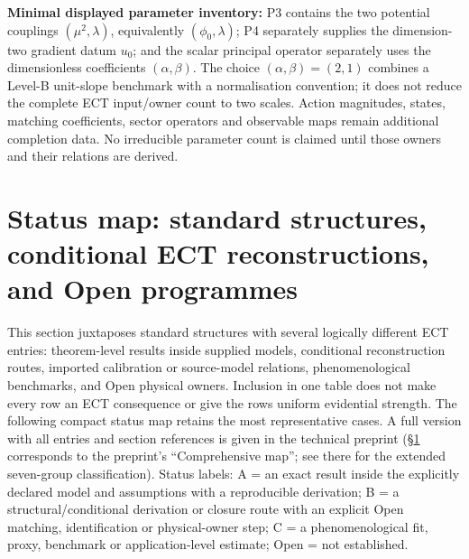 \documentclass[11pt,a4paper]{article}
\begin{document}
\textbf{Minimal displayed parameter inventory:} P3 contains the two potential
couplings $(\mu^2,\lambda)$, equivalently $(\phi_0,\lambda)$; P4 separately
supplies the dimension-two gradient datum $u_0$; and the scalar principal
operator separately uses the dimensionless coefficients $(\alpha,\beta)$.
The choice $(\alpha,\beta)=(2,1)$ combines a Level-B unit-slope benchmark with
a normalisation convention; it does not reduce the complete ECT
input/owner count to two scales.  Action magnitudes, states, matching
coefficients, sector operators and observable maps remain additional
completion data.  No irreducible parameter count is claimed until those
owners and their relations are derived.


\section{Status map: standard structures, conditional ECT reconstructions, and Open programmes}
\label{sec:pop_postulates_reinterpreted}

This section juxtaposes standard structures with several logically
different ECT entries: theorem-level results inside supplied models,
conditional reconstruction routes, imported calibration or source-model
relations, phenomenological benchmarks, and Open physical owners.  Inclusion
in one table does not make every row an ECT consequence or give the rows
uniform evidential strength.  The following compact status map retains the
most representative cases. A full version with all entries and
section references is given in the technical preprint
(\S\ref{sec:pop_postulates_reinterpreted} corresponds to the
preprint's ``Comprehensive map''; see there for the extended seven-group
classification). Status labels: A = an exact result inside the explicitly
declared model and assumptions with a reproducible derivation; B = a
structural/conditional derivation or closure route with an explicit Open
matching, identification or physical-owner step; C = a phenomenological fit,
proxy, benchmark or application-level estimate; Open = not established.
\end{document}
